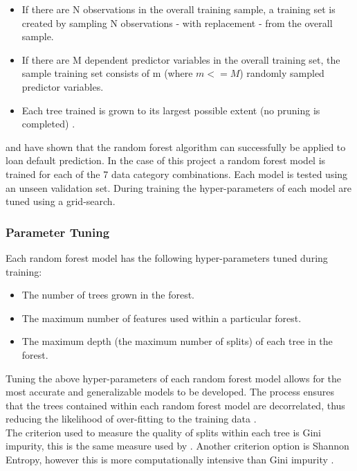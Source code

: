 \begin{itemize}
    \item If there are N observations in the overall training sample, a training set is created by sampling N observations - with replacement - from the overall sample. 
    \item If there are M dependent predictor variables in the overall training set, the sample training set consists of m (where $m<=M$) randomly sampled predictor variables. 
    \item Each tree trained is grown to its largest possible extent (no pruning is completed) \parencite{RandomForest}.
\end{itemize}

\textcite{BagWang} and \textcite{BigDataMicroFiance} have shown that the random forest algorithm can successfully be applied to loan default prediction. In the case of this project a random forest model is trained for each of the 7 data category combinations. Each model is tested using an unseen validation set. During training the hyper-parameters of each model are tuned using a grid-search. \newpage

\subsubsection{Parameter Tuning}

Each random forest model has the following hyper-parameters tuned during training:

\begin{itemize}
    \item The number of trees grown in the forest.
    \item The maximum number of features used within a particular forest. 
    \item The maximum depth (the maximum number of splits) of each tree in the forest.
\end{itemize}

Tuning the above hyper-parameters of each random forest model allows for the most accurate and generalizable models to be developed. The process ensures that the trees contained within each random forest model are decorrelated, thus reducing the likelihood of over-fitting to the training data \parencite{RF_Tuning}. \\

The criterion used to measure the quality of splits within each tree is Gini impurity, this is the same measure used by \textcite{DecTreesZekic}. Another criterion option is Shannon Entropy, however this is more computationally intensive than Gini impurity \parencite{Gini}. \\

